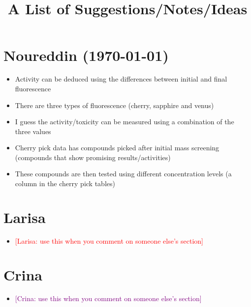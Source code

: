 \documentclass[a4paper,12pt, english]{article}
\newcommand{\kibitz}[2]{\ifnum\Comments=1\textcolor{#1}{#2}\fi}
\newcommand{\ls}[1]{\kibitz{red}      {[Larisa: #1]}}
\newcommand{\cg}[1]  {\kibitz{purple}   {[Crina: #1]}}
\begin{document}
\title{A List of Suggestions/Notes/Ideas}

\large
\section{Noureddin (\today)}
\begin{itemize}
	\item Activity can be deduced using the differences between initial and final fluorescence
	\item There are three types of fluorescence (cherry, sapphire and venus)
	\item I guess the activity/toxicity can be measured using a combination of the three values
	\item Cherry pick data has compounds picked after initial mass screening (compounds that show promising results/activities)
	\item These compounds are then tested using different concentration levels (a column in the cherry pick tables)
\end{itemize}  

\section{Larisa}
\begin{itemize}
	\item \ls{use this when you comment on someone else's section}
\end{itemize}

\section{Crina}
\begin{itemize}
	\item \cg{use this when you comment on someone else's section}
\end{itemize}


		
\end{document}

